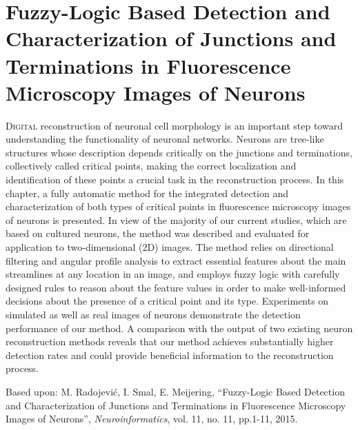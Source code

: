 % 
%
\chpos{15mm}{8mm}
\chapter[Fuzzy-Logic Based Detection and Characterization of Junctions and Terminations in Fluorescence Microscopy Images of Neurons]{Fuzzy-Logic Based Detection and Characterization of Junctions and Terminations in Fluorescence Microscopy Images of Neurons}
\label{ch2:fuzzy}
{\small \lettrine{D}{igital} reconstruction of neuronal cell morphology is an important step toward understanding the functionality of neuronal networks. Neurons are tree-like structures whose description depends critically on the junctions and terminations, collectively called critical points, making the correct localization and identification of these points a crucial task in the reconstruction process. In this chapter, a fully automatic method for the integrated detection and characterization of both types of critical points in fluorescence microscopy images of neurons is presented. In view of the majority of our current studies, which are based on cultured neurons, the method was described and evaluated for application to two-dimensional (2D) images. The method relies on directional filtering and angular profile analysis to extract essential features about the main streamlines at any location in an image, and employs fuzzy logic with carefully designed rules to reason about the feature values in order to make well-informed decisions about the presence of a critical point and its type. Experiments on simulated as well as real images of neurons demonstrate the detection performance of our method. A comparison with the output of two existing neuron reconstruction methods reveals that our method achieves substantially higher detection rates and could provide beneficial information to the reconstruction process.\par}
\vspace*{11em}
\begin{publish}
Based upon: M. Radojevi\'{c}, I. Smal, E. Meijering, ``Fuzzy-Logic Based Detection and Characterization of Junctions and Terminations in Fluorescence Microscopy Images of Neurons'', \textit{Neuroinformatics}, vol. 11, no. 11, pp.1-11, 2015.   
\end{publish}

